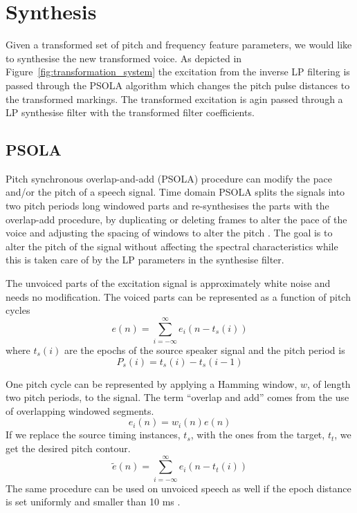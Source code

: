 

\section{Synthesis} %
\label{sec:synthesis}
Given a transformed set of pitch and frequency feature parameters, we would like to synthesise the new transformed voice. As depicted in Figure~\ref{fig:transformation_system} the excitation from the inverse LP filtering is passed through the PSOLA algorithm which changes the pitch pulse distances to the transformed markings. The transformed excitation is agin passed through a LP synthesise filter with the transformed filter coefficients.

\subsection{PSOLA} %
\label{sub:psola}
Pitch synchronous overlap-and-add (PSOLA) procedure can modify the pace and/or the pitch of a speech signal. Time domain PSOLA splits the signals into two pitch periods long windowed parts and re-synthesises the parts with the overlap-add procedure, by duplicating or deleting frames to alter the pace of the voice and adjusting the spacing of windows to alter the pitch \cite{taletek}. The goal is to alter the pitch of the signal without affecting the spectral characteristics while this is taken care of by the LP parameters in the synthesise filter. 

The unvoiced parts of the excitation signal is approximately white noise and needs no modification. The voiced parts can be represented as a function of pitch cycles
\begin{equation}
	e(n)=\sum_{i=-\infty}^{\infty}e_i(n-t_s(i))
\end{equation}
where $t_s(i)$ are the epochs of the source speaker signal and the pitch period is
\begin{equation}
	P_s(i) = t_s(i)-t_s(i-1)
\end{equation}

One pitch cycle can be represented by applying a Hamming window, $w$, of length two pitch periods, to the signal. The term ``overlap and add'' comes from the use of overlapping windowed segments.
\begin{equation}
	e_i(n)=w_i(n)e(n)
\end{equation}
If we replace the source timing instances, $t_s$, with the ones from the target, $t_t$, we get the desired pitch contour.
\begin{equation}
	\tilde{e}(n)=\sum_{i=-\infty}^{\infty}e_i(n-t_t(i)) %
\end{equation}
The same procedure can be used on unvoiced speech as well if the epoch distance is set uniformly and smaller than 10 ms \cite{moulines95a}.

